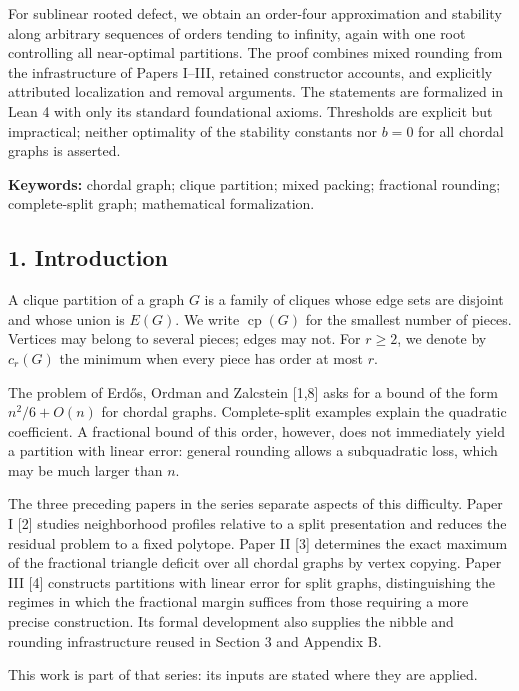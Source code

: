 \documentclass[english,11pt,a4paper]{article}
\begin{document}
For sublinear rooted defect, we obtain an order-four approximation and stability along arbitrary sequences of orders tending to infinity, again with one root controlling all near-optimal partitions. The proof combines mixed rounding from the infrastructure of Papers I--III, retained constructor accounts, and explicitly attributed localization and removal arguments. The statements are formalized in Lean 4 with only its standard foundational axioms. Thresholds are explicit but impractical; neither optimality of the stability constants nor \(b=0\) for all chordal graphs is asserted.

\textbf{Keywords:} chordal graph; clique partition; mixed packing; fractional rounding; complete-split graph; mathematical formalization.

\subsection{1. Introduction}\label{introduction}

A clique partition of a graph \(G\) is a family of cliques whose edge sets are disjoint and whose union is \(E(G)\). We write \(\operatorname{cp}(G)\) for the smallest number of pieces. Vertices may belong to several pieces; edges may not. For \(r\ge2\), we denote by \(c_r(G)\) the minimum when every piece has order at most \(r\).

The problem of Erdős, Ordman and Zalcstein {[}1,8{]} asks for a bound of the form \(n^2/6+O(n)\) for chordal graphs. Complete-split examples explain the quadratic coefficient. A fractional bound of this order, however, does not immediately yield a partition with linear error: general rounding allows a subquadratic loss, which may be much larger than \(n\).

The three preceding papers in the series separate aspects of this difficulty. Paper I {[}2{]} studies neighborhood profiles relative to a split presentation and reduces the residual problem to a fixed polytope. Paper II {[}3{]} determines the exact maximum of the fractional triangle deficit over all chordal graphs by vertex copying. Paper III {[}4{]} constructs partitions with linear error for split graphs, distinguishing the regimes in which the fractional margin suffices from those requiring a more precise construction. Its formal development also supplies the nibble and rounding infrastructure reused in Section 3 and Appendix B.

This work is part of that series: its inputs are stated where they are applied.
\end{document}
